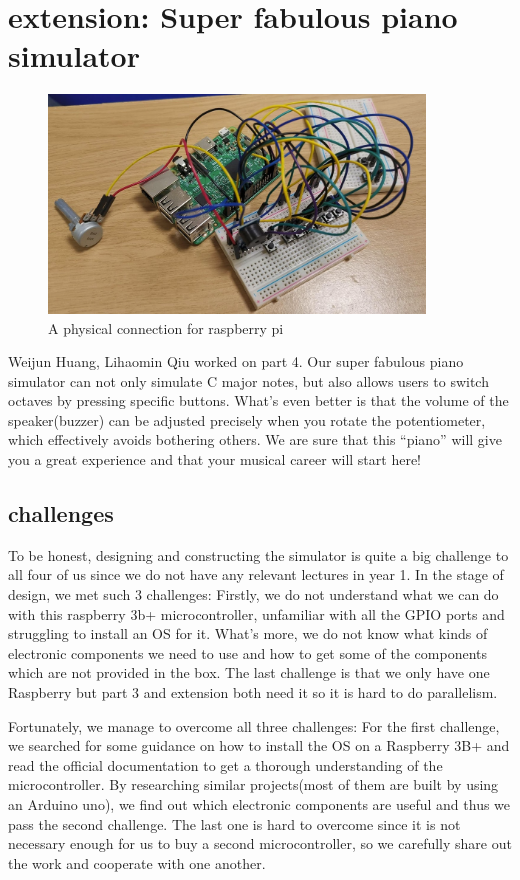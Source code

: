 \documentclass[11pt]{article}
\begin{document}
\section{extension: Super fabulous piano simulator}

\begin{figure}[H]
	\centering
	\includegraphics[width=10cm]{src/extension.png}
	\caption{A physical connection for raspberry pi}
	\label{fig:extension}
\end{figure}

Weijun Huang, Lihaomin Qiu worked on part 4. Our super fabulous piano simulator can not only simulate C major notes, but also allows users to switch octaves by pressing specific buttons. What’s even better is that the volume of the speaker(buzzer) can be adjusted precisely when you rotate the potentiometer, which effectively avoids bothering others.
We are sure that this “piano” will give you a great experience and that your musical career will start here!

\subsection{challenges}

To be honest, designing and constructing the simulator is quite a big challenge to all four of us since we do not have any relevant lectures in year 1. 
In the stage of design, we met such 3 challenges:
Firstly, we do not understand what we can do with this raspberry 3b+ microcontroller, unfamiliar with all the GPIO ports and struggling to install an OS for it. What’s more, we do not know what kinds of electronic components we need to use and how to get some of the components which are not provided in the box. The last challenge is that we only have one Raspberry but part 3 and extension both need it so it is hard to do parallelism.

Fortunately, we manage to overcome all three challenges:
For the first challenge, we searched for some guidance on how to install the OS on a Raspberry 3B+ and read the official documentation to get a thorough understanding of the microcontroller. By researching similar projects(most of them are built by using an Arduino uno), we find out which electronic components are useful and thus we pass the second challenge. The last one is hard to overcome since it is not necessary enough for us to buy a second microcontroller, so we carefully share out the work and cooperate with one another.
\end{document}
